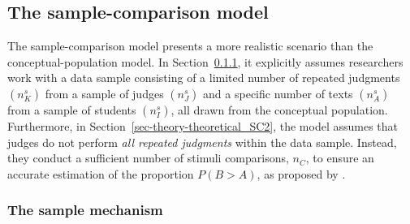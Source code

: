 \documentclass[
  authoryear,
  review,
  1p]{elsarticle}
\begin{document}
\subsection{The sample-comparison
model}\label{sec-theory-theoretical_SC}

The sample-comparison model presents a more realistic scenario than the
conceptual-population model. In
Section~\ref{sec-theory-theoretical_SC1}, it explicitly assumes
researchers work with a data sample consisting of a limited number of
repeated judgments \((n^{s}_{K})\) from a sample of judges
\((n^{s}_{J})\) and a specific number of texts \((n^{s}_{A})\) from a
sample of students \((n^{s}_{I})\), all drawn from the conceptual
population. Furthermore, in Section~\ref{sec-theory-theoretical_SC2},
the model assumes that judges do not perform \emph{all repeated
judgments} within the data sample. Instead, they conduct a sufficient
number of stimuli comparisons, \(n_{C}\), to ensure an accurate
estimation of the proportion \(P(B>A)\), as proposed by
\citet{Thurstone_1927b}.

\subsubsection{The sample mechanism}\label{sec-theory-theoretical_SC1}
\end{document}
